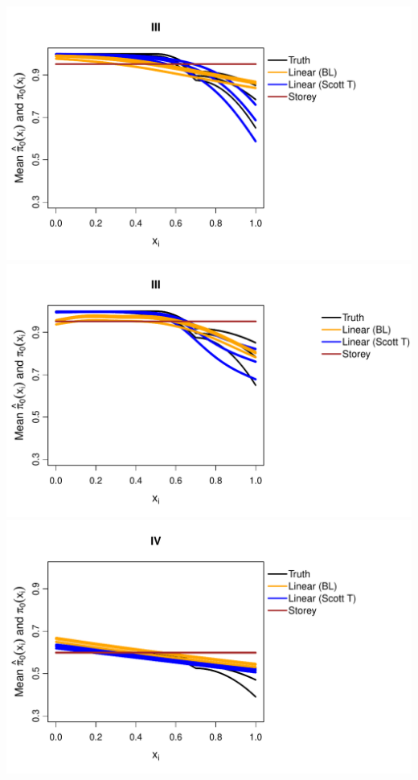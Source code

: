 \documentclass{article}\usepackage[]{graphicx}\usepackage[]{color}
\makeatletter
\def\maxwidth{ %
  \ifdim\Gin@nat@width>\linewidth
    \linewidth
  \else
    \Gin@nat@width
  \fi
}
\newenvironment{knitrout}{}{} %
\makeatother
\begin{document}
\begin{knitrout}
{\includegraphics[width=\maxwidth]{Figures/plot_of_mean_estimates_norm_10000-4} 
\includegraphics[width=\maxwidth]{Figures/plot_of_mean_estimates_norm_10000-5} 
\includegraphics[width=\maxwidth]{Figures/plot_of_mean_estimates_norm_10000-6} 
}
\end{knitrout}
\end{document}
